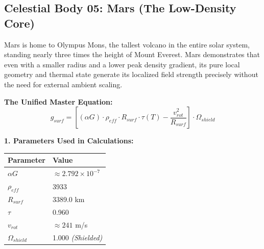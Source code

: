 \documentclass[11pt, a4paper]{article}
\begin{document}
\clearpage
\subsection{Celestial Body 05: Mars (The Low-Density Core)}
  Mars is home to Olympus Mons, the tallest volcano in the entire solar system, standing nearly three times the height of Mount Everest. Mars demonstrates that even with a smaller radius and a lower peak density gradient, its pure local geometry and thermal state generate its localized field strength precisely without the need for external ambient scaling.

  \vspace{0.5em}
  \noindent \textbf{The Unified Master Equation:}
  $$ g_{surf} = \left[ (\alpha G) \cdot \rho_{eff} \cdot R_{surf} \cdot \tau(T) - \frac{v_{rot}^2}{R_{surf}} \right] \cdot \Omega_{shield} $$

  \vspace{0.5em}
  \noindent \textbf{1. Parameters Used in Calculations:} \\[0.5em]
  \begingroup
  \renewcommand{\arraystretch}{1.3}
  \hspace*{2em}
  \begin{tabular}{|l|l|}
    \hline
    \textbf{Parameter} & \textbf{Value} \\ \hline
    $\alpha G$ & $\approx 2.792 \times 10^{-7}$ \\ \hline
    $\rho_{eff}$ & 3933 \\ \hline
    $R_{surf}$ & 3389.0 km \\ \hline
    $\tau$ & 0.960 \\ \hline
    $v_{rot}$ & $\approx 241$ m/s \\ \hline
    $\Omega_{shield}$ & 1.000 \textit{(Shielded)} \\ \hline
  \end{tabular}
  \endgroup
\end{document}
